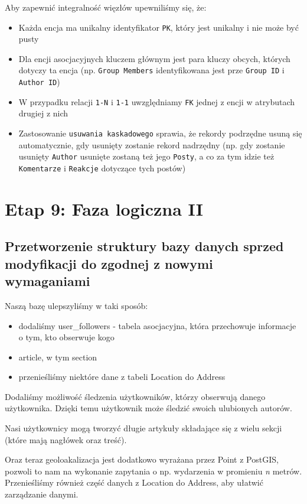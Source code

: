 \documentclass{article}
\begin{document}
Aby zapewnić integralność więzłów upewniliśmy się, że:
\begin{itemize}
    \item Każda encja ma unikalny identyfikator \texttt{PK}, który jest unikalny i nie może być pusty
    \item Dla encji asocjacyjnych kluczem głównym jest para kluczy obcych, których dotyczy ta encja (np. \texttt{Group Members} identyfikowana jest prze \texttt{Group ID} i \texttt{Author ID})
    \item W przypadku relacji \texttt{1-N}  i \texttt{1-1} uwzględniamy \texttt{FK} jednej z encji w atrybutach drugiej z nich
    \item Zastosowanie \texttt{usuwania kaskadowego} sprawia, że rekordy podrzędne usuną się automatycznie, gdy usunięty zostanie rekord nadrzędny (np. gdy zostanie usunięty \texttt{Author} usunięte zostaną też jego \texttt{Posty}, a co za tym idzie też \texttt{Komentarze} i \texttt{Reakcje} dotyczące tych postów)
\end{itemize}

\newpage

\section{Etap 9: Faza logiczna II}

\subsection{Przetworzenie struktury bazy danych sprzed modyfikacji do zgodnej z nowymi wymaganiami}

Naszą bazę ulepszyliśmy w taki sposób:

\begin{itemize}
    \item dodaliśmy user\_followers - tabela asocjacyjna, która przechowuje informacje o tym, kto obserwuje kogo
    \item article, w tym section
    \item przenieśliśmy niektóre dane z tabeli Location do Address
\end{itemize}

Dodaliśmy możliwość śledzenia użytkowników, którzy obserwują danego użytkownika. Dzięki temu użytkownik może śledzić swoich ulubionych autorów.

Nasi użytkownicy mogą tworzyć długie artykuły składające się z wielu sekcji (które mają nagłówek oraz treść).

Oraz teraz geoloakalizacja jest dodatkowo wyrażana przez Point z PostGIS, pozwoli to nam na wykonanie zapytania o np. wydarzenia w promieniu \textit{n} metrów. Przenieśliśmy również część danych z Location do Address, aby ułatwić zarządzanie danymi.
\end{document}

